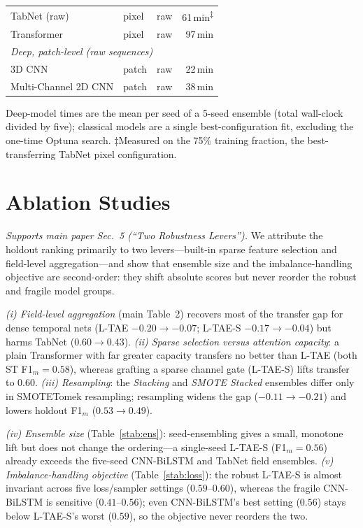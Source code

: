 \documentclass[preprint,authoryear,3p]{elsarticle}
\begin{document}
\begin{table}[!t]
\begin{tabular}{lllr}
TabNet (raw)           & pixel & raw & 61\,min\textsuperscript{$\ddagger$} \\
Transformer            & pixel & raw & 97\,min \\
\midrule
\multicolumn{4}{l}{\emph{Deep, patch-level (raw sequences)}}\\
3D CNN                 & patch & raw & 22\,min \\
Multi-Channel 2D CNN   & patch & raw & 38\,min \\
\bottomrule
\end{tabular}
\par\vspace{3pt}
\begin{minipage}{\linewidth}
\footnotesize
Deep-model times are the mean per seed of a 5-seed ensemble (total wall-clock divided by five);
classical models are a single best-configuration fit, excluding the one-time Optuna search.
$\ddagger$Measured on the 75\% training fraction, the best-transferring TabNet pixel configuration.
\end{minipage}
\end{table}

\section{Ablation Studies}
\label{sec:ablation}
\emph{Supports main paper Sec.~5 (``Two Robustness Levers'').}
We attribute the holdout ranking primarily to two levers---built-in sparse feature selection and
field-level aggregation---and show that ensemble size and the imbalance-handling objective are
second-order: they shift absolute scores but never reorder the robust and fragile model groups.

\emph{(i) Field-level aggregation} (main Table~2) recovers most of the transfer gap for dense
temporal nets (L-TAE $-0.20\rightarrow-0.07$; L-TAE-S $-0.17\rightarrow-0.04$) but harms TabNet
($0.60\rightarrow0.43$). \emph{(ii) Sparse selection versus attention capacity}: a plain Transformer
with far greater capacity transfers no better than L-TAE (both ST F1$_m=0.58$), whereas grafting a
sparse channel gate (L-TAE-S) lifts transfer to $0.60$. \emph{(iii) Resampling}: the \emph{Stacking}
and \emph{SMOTE Stacked} ensembles differ only in SMOTETomek resampling; resampling widens the gap
($-0.11\rightarrow-0.21$) and lowers holdout F1$_m$ ($0.53\rightarrow0.49$).

\emph{(iv) Ensemble size} (Table~\ref{stab:ens}): seed-ensembling gives a small, monotone lift but
does not change the ordering---a single-seed L-TAE-S (F1$_m=0.56$) already exceeds the five-seed
CNN-BiLSTM and TabNet field ensembles. \emph{(v) Imbalance-handling objective}
(Table~\ref{stab:loss}): the robust L-TAE-S is almost invariant across five loss/sampler settings
($0.59$--$0.60$), whereas the fragile CNN-BiLSTM is sensitive ($0.41$--$0.56$); even CNN-BiLSTM's
best setting ($0.56$) stays below L-TAE-S's worst ($0.59$), so the objective never reorders the two.
\end{document}
